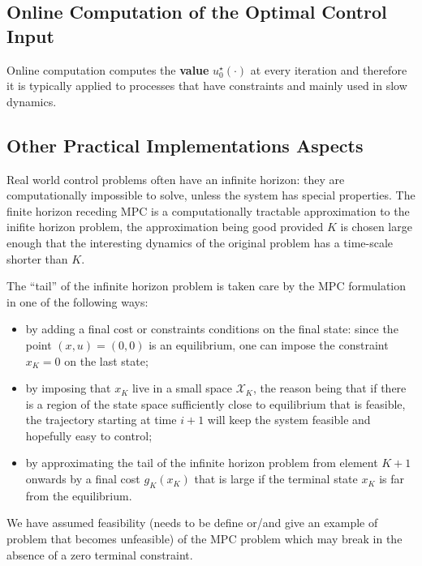 \documentclass[11pt]{report}
\begin{document}
\subsection{Online Computation of the Optimal Control Input}
\label{sec:online-computation-MPC}

Online computation computes the \textbf{value} $u_0^\star(\cdot)$ at every iteration and therefore it is typically applied to processes that have constraints and mainly used in slow dynamics.

\subsection{Other Practical Implementations Aspects}
\label{sec:other-practical-implementation-aspects}

Real world control problems often have an infinite horizon: they are computationally impossible to solve, unless the system has special properties. The finite horizon receding MPC is a computationally tractable approximation to the inifite horizon problem, the approximation being good provided $K$ is chosen large enough that the interesting dynamics of the original problem has a time-scale shorter than $K$.

The ``tail'' of the infinite horizon problem is taken care by the MPC formulation in one of the following ways:
\begin{itemize}
\item by adding a final cost or constraints conditions on the final state: since the point $(x,u)=(0,0)$ is an equilibrium, one can impose the constraint $x_K=0$ on the last state;
\item by imposing that $x_K$ live in a small space $\mathcal{X}_K$, the reason being that if there is a region of the state space sufficiently close to equilibrium that is feasible, the trajectory starting at time $i+1$ will keep the system feasible and hopefully easy to control;
\item by approximating the tail of the infinite horizon problem from element $K+1$ onwards by a final cost $g_K(x_K)$ that is large if the terminal state $x_K$ is far from the equilibrium.
\end{itemize}

We have assumed feasibility (needs to be define or/and give an example of problem that becomes unfeasible) of the MPC problem which may break in the absence of a zero terminal constraint.

\end{document}
